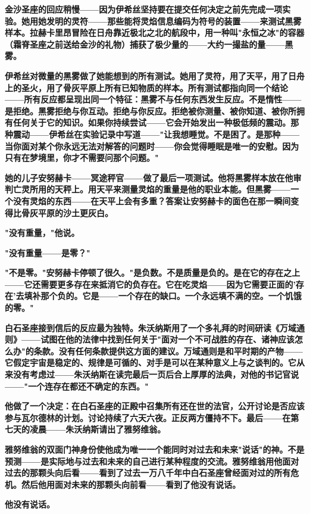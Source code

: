 \documentclass[12pt,a4paper,openany]{ctexbook}
\begin{document}
\textbf{金沙圣座的回应稍慢——因为伊希丝坚持要在提交任何决定之前先完成一项实验。她用她发明的灵符——那些能将灵焰信息编码为符号的装置——来测试黑雾样本。拉赫卡里昂冒险在日舟靠近极北之北的航段中，用一种叫"永恒之冰"的容器（霜脊圣座之前送给金沙的礼物）捕获了极少量的——大约一撮盐的量——黑雾。}


\textbf{伊希丝对微量的黑雾做了她能想到的所有测试。她用了灵符，用了天平，用了日舟上的圣火，用了骨灰平原上所有已知物质的样本。所有测试都指向同一个结论——所有反应都呈现出同一个特征：黑雾不与任何东西发生反应。不是惰性——是拒绝。黑雾拒绝与你互动。拒绝与你反应。拒绝被你测量、被你知道、被你所拥有任何关于它的知识。如果你持续尝试——它会开始发出一种极低频的震动。那种震动——伊希丝在实验记录中写道——"让我想睡觉。不是困了。是那种——当你面对某个你永远无法对解答的问题时——你会觉得睡眠是唯一的安慰。因为只有在梦境里，你才不需要问那个问题。"}


\textbf{她的儿子安努赫卡——冥途秤官——做了最后一项测试。他将黑雾样本放在他审判亡灵所用的天秤上。用天平来测量灵焰的重量是他的职业本能。但黑雾——一个没有灵焰的东西——在天平上会有多重？答案让安努赫卡的面色在那一瞬间变得比骨灰平原的沙土更灰白。}


\textbf{"没有重量，"他说。}


\textbf{"没有重量——是零？"}


\textbf{"不是零。"安努赫卡停顿了很久。"是负数。不是质量是负的。是在它的存在之上——它还需要更多存在来抵消它的负存在。它在吃灵焰——因为它需要正面的'存在'去填补那个负的。它是——一个存在的缺口。一个永远填不满的空。一个饥饿的零。"}


\textbf{白石圣座接到信后的反应最为独特。朱沃纳斯用了一个多礼拜的时间研读《万域通则》——试图在他的法律中找到任何关于"面对一个不可战胜的存在、诸神应该怎么办"的条款。没有任何条款提供这方面的建议。万域通则是和平时期的产物——它假定宇宙是稳定的、规律是可循的、对手是可以在某种意义上与之谈判的。它从来没有考虑过——朱沃纳斯在读完最后一页后合上厚厚的法典，对他的书记官说——"一个连存在都还不确定的东西。"}


\textbf{他做了一个决定：在白石圣座的正殿中召集所有还在世的法官，公开讨论是否应该参与瓦尔德林的计划。讨论持续了六天六夜。正反两方僵持不下。最后——在第七天的凌晨——朱沃纳斯请出了雅努维翁。}


\textbf{雅努维翁的双面门神身份使他成为唯一一个能同时对过去和未来"说话"的神。不是预测——是实际地与过去和未来的自己进行某种程度的交流。雅努维翁用他面对过去的那颗头向后看——看到了过去一万八千年中白石圣座曾经面对过的所有危机。然后他用面对未来的那颗头向前看——看到了他没有说话。}


\textbf{他没有说话。}
\end{document}
